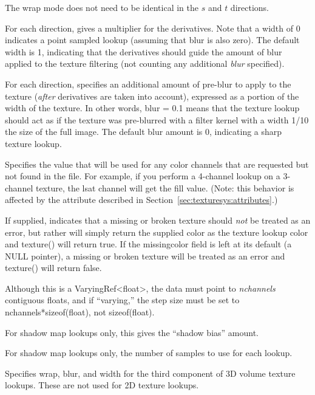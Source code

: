 The wrap mode does not need to be identical in the $s$ and $t$
directions.
\apiend

For each direction, gives a multiplier for the derivatives.  Note that
a width of 0 indicates a point sampled lookup (assuming that blur is
also zero).  The default width is 1, indicating that the derivatives
should guide the amount of blur applied to the texture filtering (not
counting any additional \emph{blur} specified).
\apiend

For each direction, specifies an additional amount of pre-blur to apply
to the texture (\emph{after} derivatives are taken into account),
expressed as a portion of the width of the texture.  In other words,
blur = 0.1 means that the texture lookup should act as if the texture
was pre-blurred with a filter kernel with a width 1/10 the size of the
full image.  The default blur amount is 0, indicating a sharp texture
lookup.
\apiend

Specifies the value that will be used for any color channels that are
requested but not found in the file.  For example, if you perform a
4-channel lookup on a 3-channel texture, the lsat channel will
get the fill value.  (Note: this behavior is affected by the
 attribute described in 
Section~\ref{sec:texturesys:attributes}.)
\apiend

If supplied, indicates that a missing or broken texture should \emph{not}
be treated as an error, but rather will simply return the supplied color
as the texture lookup color and {\cf texture()} will return {\cf true}.  
If the {\cf missingcolor} field is left at its default (a NULL pointer),
a missing or broken texture will be treated as an error and
{\cf texture()} will return {\cf false}.

Although this is a {\cf VaryingRef<float>}, the data must point to
\emph{nchannels} contiguous floats, and if ``varying,'' the step size must
be set to {\cf nchannels*sizeof(float)}, not {\cf sizeof(float)}.
\apiend

For shadow map lookups only, this gives the ``shadow bias'' amount.
\apiend

For shadow map lookups only, the number of samples to use for each lookup.
\apiend

Specifies wrap, blur, and width for the third component of 3D volume texture
lookups.  These are not used for 2D texture lookups.
\apiend

